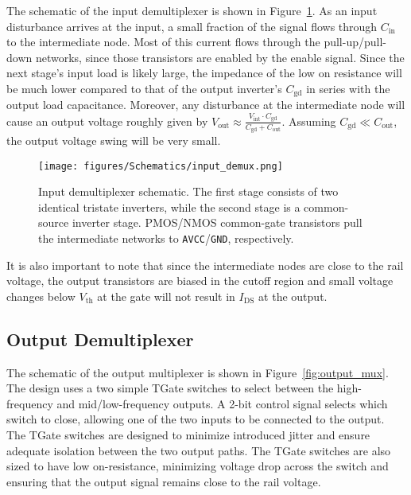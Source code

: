 The schematic of the input demultiplexer is shown in Figure~\ref{fig:input_demux}. As an input disturbance arrives at the input, a small fraction of the signal flows through \(C_{\text{in}}\) to the intermediate node. Most of this current flows through the pull-up/pull-down networks, since those transistors are enabled by the enable signal. Since the next stage's input load is likely large, the impedance of the low on resistance will be much lower compared to that of the output inverter's \(C_{\text{gd}}\) in series with the output load capacitance. Moreover, any disturbance at the intermediate node will cause an output voltage roughly given by \(V_{\text{out}} \approx \frac{V_{\text{int}}\cdot C_{\text{gd}}}{C_{\text{gd}} + C_{\text{out}}}\). Assuming \(C_{\text{gd}} \ll C_{\text{out}}\), the output voltage swing will be very small.

\begin{figure}[H]
  \centering
  \texttt{[image: figures/Schematics/input\_demux.png]}
  \caption{Input demultiplexer schematic. The first stage consists of two identical tristate inverters, while the second stage is a common-source inverter stage. PMOS/NMOS common-gate transistors pull the intermediate networks to \texttt{AVCC}/\texttt{GND}, respectively.}
  \label{fig:input_demux}
\end{figure}

It is also important to note that since the intermediate nodes are close to the rail voltage, the output transistors are biased in the cutoff region and small voltage changes below \(V_\text{th}\) at the gate will not result in \(I_\text{DS}\) at the output.

\subsection{Output Demultiplexer}

The schematic of the output multiplexer is shown in Figure~\ref{fig:output_mux}. The design uses a two simple TGate switches to select between the high-frequency and mid/low-frequency outputs.
A 2-bit control signal selects which switch to close, allowing one of the two inputs to be connected to the output. The TGate switches are designed to minimize introduced jitter and ensure adequate isolation between the two output paths. The TGate switches are also sized to have low on-resistance, minimizing voltage drop across the switch and ensuring that the output signal remains close to the rail voltage.


